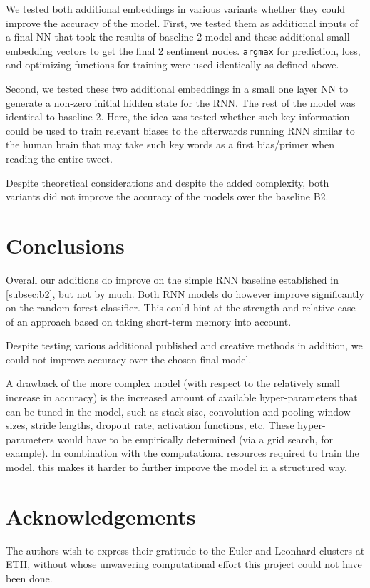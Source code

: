\documentclass[10pt,conference,compsocconf]{IEEEtran}
\begin{document}
We tested both additional embeddings in various variants whether they could improve 
the accuracy of the model. First, we tested them as additional inputs of a final NN 
that took the results of baseline 2 model and these additional small embedding 
vectors to get the final 2 sentiment nodes. \texttt{argmax} for prediction, loss,
and optimizing functions for training were used identically as defined above.

Second, we tested these two additional embeddings in a small one layer NN to
generate a non-zero initial hidden state for the RNN. The rest of the model was 
identical to baseline 2. Here, the idea was tested whether such key information 
could be used to train relevant biases to the afterwards running RNN similar to the 
human brain that may take such key words as a first bias/primer when reading the 
entire tweet.

Despite theoretical considerations and despite the added complexity, both variants 
did not improve the accuracy of the models over the baseline B2.


\section{Conclusions}

Overall our additions do improve on the simple RNN baseline
established in \autoref{subsec:b2}, but not by much. Both RNN models do
however improve significantly on the random forest classifier. This
could hint at the strength and relative ease of an approach based on
taking short-term memory into account.


Despite testing various additional published and creative methods in addition,
we could not improve accuracy over the chosen final model.

A drawback of the more complex model (with respect to the relatively
small increase in accuracy) is the increased amount of available hyper-parameters
that can be tuned in the model, such as stack size,
convolution and pooling window sizes, stride lengths, dropout rate,
activation functions, etc. These hyper-parameters would have to be empirically
determined (via a grid search, for example). In combination with the
computational resources required to train the model, this makes it
 harder to further improve the model in a structured way.

\section*{Acknowledgements}

The authors wish to express their gratitude to the Euler and Leonhard
clusters at ETH, without whose unwavering computational effort this
project could not have been done.



\end{document}
